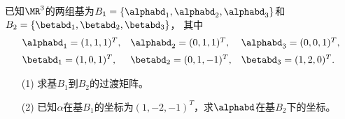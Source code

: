 \begin{frame}
  
    \begin{li}
      已知$\MR^3$的两组基为$B_1=\{\alphabd_1,\alphabd_2,\alphabd_3\}$和$B_2=\{\betabd_1,\betabd_2,\betabd_3\}$，
      其中
      $$
      \begin{array}{lll}
        \alphabd_1=(1,1,1)^T,&\alphabd_2=(0,1,1)^T,&\alphabd_3=(0,0,1)^T, \\[0.2cm]
        \betabd_1=(1,0,1)^T,&\betabd_2=(0,1,-1)^T,&\betabd_3=(1,2,0)^T.  
      \end{array}
      $$
      \begin{itemize}
      \item[(1)] 求基$B_1$到$B_2$的过渡矩阵。
      \item[(2)] 已知$\alpha$在基$B_1$的坐标为$(1,-2,-1)^T$，求$\alphabd$在基$B_2$下的坐标。
      \end{itemize}
      
    \end{li}
  
\end{frame}


